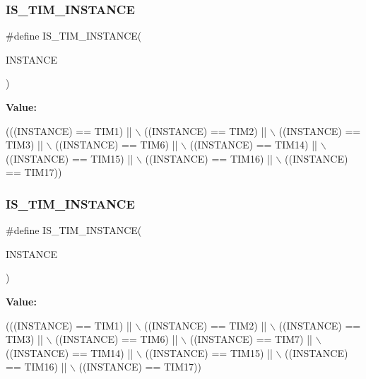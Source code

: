 \subsubsection{\texorpdfstring{I\+S\+\_\+\+T\+I\+M\+\_\+\+I\+N\+S\+T\+A\+N\+CE}{IS\_TIM\_INSTANCE}\hspace{0.1cm}{\footnotesize\ttfamily [9/16]}}
{\footnotesize\ttfamily \#define I\+S\+\_\+\+T\+I\+M\+\_\+\+I\+N\+S\+T\+A\+N\+CE(\begin{DoxyParamCaption}\item[{}]{I\+N\+S\+T\+A\+N\+CE }\end{DoxyParamCaption})}

{\bfseries Value\+:}
\begin{DoxyCode}
(((INSTANCE) == TIM1)    || \(\backslash\)
   ((INSTANCE) == TIM2)    || \(\backslash\)
   ((INSTANCE) == TIM3)    || \(\backslash\)
   ((INSTANCE) == TIM6)    || \(\backslash\)
   ((INSTANCE) == TIM14)   || \(\backslash\)
   ((INSTANCE) == TIM15)   || \(\backslash\)
   ((INSTANCE) == TIM16)   || \(\backslash\)
   ((INSTANCE) == TIM17))
\end{DoxyCode}
\mbox{\label{group___exported__macro_gaba506eb03409b21388d7c5a6401a4f98}} 
\subsubsection{\texorpdfstring{I\+S\+\_\+\+T\+I\+M\+\_\+\+I\+N\+S\+T\+A\+N\+CE}{IS\_TIM\_INSTANCE}\hspace{0.1cm}{\footnotesize\ttfamily [10/16]}}
{\footnotesize\ttfamily \#define I\+S\+\_\+\+T\+I\+M\+\_\+\+I\+N\+S\+T\+A\+N\+CE(\begin{DoxyParamCaption}\item[{}]{I\+N\+S\+T\+A\+N\+CE }\end{DoxyParamCaption})}

{\bfseries Value\+:}
\begin{DoxyCode}
(((INSTANCE) == TIM1)    || \(\backslash\)
   ((INSTANCE) == TIM2)    || \(\backslash\)
   ((INSTANCE) == TIM3)    || \(\backslash\)
   ((INSTANCE) == TIM6)    || \(\backslash\)
   ((INSTANCE) == TIM7)    || \(\backslash\)
   ((INSTANCE) == TIM14)   || \(\backslash\)
   ((INSTANCE) == TIM15)   || \(\backslash\)
   ((INSTANCE) == TIM16)   || \(\backslash\)
   ((INSTANCE) == TIM17))
\end{DoxyCode}
\mbox{\label{group___exported__macro_gaba506eb03409b21388d7c5a6401a4f98}} 
